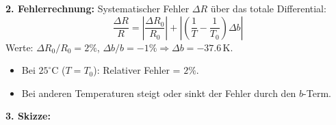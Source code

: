 \documentclass{article}
\begin{document}
\textbf{2. Fehlerrechnung:}
Systematischer Fehler $\Delta R$ über das totale Differential:
\[ \frac{\Delta R}{R} = \left| \frac{\Delta R_0}{R_0} \right| + \left| \left( \frac{1}{T} - \frac{1}{T_0} \right) \Delta b \right| \]
Werte: $\Delta R_0/R_0 = 2\%$, $\Delta b/b = -1\% \Rightarrow \Delta b = -37.6\,\text{K}$.
\begin{itemize}
    \item Bei $25^\circ\text{C}$ ($T=T_0$): Relativer Fehler = $2\%$.
    \item Bei anderen Temperaturen steigt oder sinkt der Fehler durch den $b$-Term.
\end{itemize}

\textbf{3. Skizze:}
\begin{center}
\end{center}
\end{document}
